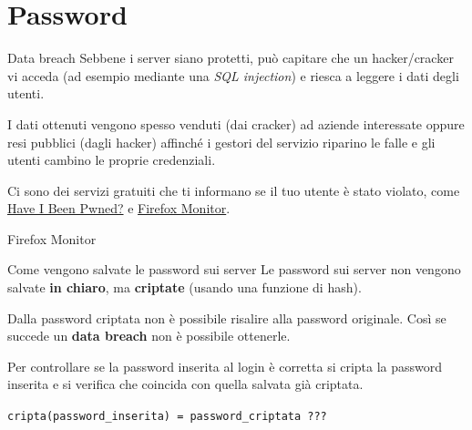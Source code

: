 
 \section{Password}

\begin{myframe}{Data breach}
  Sebbene i server siano protetti, può capitare che un hacker/cracker vi acceda (ad esempio mediante una \emph{SQL injection}) e riesca a leggere i dati degli utenti.

  \pause\medskip
  I dati ottenuti vengono spesso venduti (dai cracker) ad aziende interessate oppure resi pubblici (dagli hacker) affinché i gestori del servizio riparino le falle e gli utenti cambino le proprie credenziali.

  \pause\medskip
  Ci sono dei servizi gratuiti che ti informano se il tuo utente è stato violato, come \href{https://haveibeenpwned.com/}{Have I Been Pwned?} e \href{https://monitor.firefox.com/}{Firefox Monitor}.
\end{myframe}

\begin{myframe}{Firefox Monitor}
\end{myframe}

\begin{myframe}{Come vengono salvate le password sui server}
  Le password sui server non vengono salvate \textbf{in chiaro}, ma \textbf{criptate} (usando una funzione di hash).

  \pause\medskip
  Dalla password criptata non è possibile risalire alla password originale. Così se succede un \textbf{data breach} non è possibile ottenerle.

  \pause\medskip
  Per controllare se la password inserita al login è corretta si cripta la password inserita e si verifica che coincida con quella salvata già criptata.

  \texttt{cripta(password\_inserita) = password\_criptata ???}
\end{myframe}

